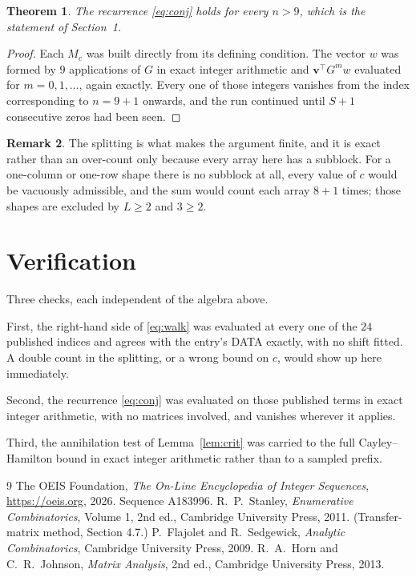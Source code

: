 \documentclass[11pt,a4paper]{article}
\theoremstyle{plain}
\newtheorem{theorem}{Theorem}
\theoremstyle{definition}
\newtheorem{remark}[theorem]{Remark}
\begin{document}
\begin{theorem}
The recurrence \eqref{eq:conj} holds for every $n>9$, which is the statement of
Section~1.
\end{theorem}

\begin{proof}
Each $M_c$ was built directly from its defining condition. The vector $w$ was formed by
$9$ applications of $G$ in exact integer arithmetic and $\mathbf{v}^{\!\top}G^{m}w$
evaluated for $m=0,1,\dots$, again exactly. Every one of those integers vanishes from the
index corresponding to $n=9+1$ onwards, and the run continued until $S+1$ consecutive
zeros had been seen.
\end{proof}

\begin{remark}
The splitting is what makes the argument finite, and it is exact rather than an
over-count only because every array here has a subblock. For a one-column or one-row
shape there is no subblock at all, every value of $c$ would be vacuously admissible, and the
sum would count each array $8+1$ times; those shapes are excluded by $L\ge2$ and
$3\ge2$.
\end{remark}

\section{Verification}

Three checks, each independent of the algebra above.

First, the right-hand side of \eqref{eq:walk} was evaluated at every one of the $24$
published indices and agrees with the entry's DATA exactly, with no shift fitted. A double
count in the splitting, or a wrong bound on $c$, would show up here immediately.

Second, the recurrence \eqref{eq:conj} was evaluated on those published terms in exact
integer arithmetic, with no matrices involved, and vanishes wherever it applies.

Third, the annihilation test of Lemma~\ref{lem:crit} was carried to the full
Cayley--Hamilton bound in exact integer arithmetic rather than to a sampled prefix.

\begin{thebibliography}{9}
 The OEIS Foundation, \emph{The On-Line Encyclopedia of Integer
Sequences}, \url{https://oeis.org}, 2026. Sequence A183996.
 R.~P.~Stanley, \emph{Enumerative Combinatorics}, Volume 1, 2nd ed.,
Cambridge University Press, 2011. (Transfer-matrix method, Section 4.7.)
 P.~Flajolet and R.~Sedgewick, \emph{Analytic Combinatorics}, Cambridge
University Press, 2009.
 R.~A.~Horn and C.~R.~Johnson, \emph{Matrix Analysis}, 2nd ed., Cambridge
University Press, 2013.
\end{thebibliography}
\end{document}
